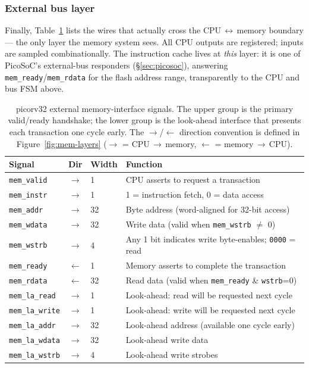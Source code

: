 \documentclass[9pt, a4paper]{extarticle}
\begin{document}
\subsubsection{External bus layer}

Finally, Table~\ref{tab:mem-signals} lists the wires that actually cross the CPU\,$\leftrightarrow$\,memory boundary --- the only layer the memory system sees. All CPU outputs are registered; inputs are sampled combinationally. The instruction cache lives at \emph{this} layer: it is one of PicoSoC's external-bus responders (\S\ref{sec:picosoc}), answering \texttt{mem\_ready}/\texttt{mem\_rdata} for the flash address range, transparently to the CPU and bus FSM above.

\begin{table}[htbp]
\centering\small
\begin{tabular}{@{}l c l p{6.3cm}@{}}
    \toprule
    Signal & Dir & Width & Function \\
    \midrule
    \texttt{mem\_valid} & $\to$ & 1 & CPU asserts to request a transaction \\
    \texttt{mem\_instr} & $\to$ & 1 & 1 = instruction fetch, 0 = data access \\
    \texttt{mem\_addr} & $\to$ & 32 & Byte address (word-aligned for 32-bit access) \\
    \texttt{mem\_wdata} & $\to$ & 32 & Write data (valid when \texttt{mem\_wstrb} $\neq$ 0) \\
    \texttt{mem\_wstrb} & $\to$ & 4 & Any 1 bit indicates write byte-enables; \texttt{0000} = read \\
    \texttt{mem\_ready} & $\leftarrow$ & 1 & Memory asserts to complete the transaction \\
    \texttt{mem\_rdata} & $\leftarrow$ & 32 & Read data (valid when \texttt{mem\_ready} \& \texttt{wstrb}=0) \\
    \midrule
    \texttt{mem\_la\_read} & $\to$ & 1 & Look-ahead: read will be requested next cycle \\
    \texttt{mem\_la\_write} & $\to$ & 1 & Look-ahead: write will be requested next cycle \\
    \texttt{mem\_la\_addr} & $\to$ & 32 & Look-ahead address (available one cycle early) \\
    \texttt{mem\_la\_wdata} & $\to$ & 32 & Look-ahead write data \\
    \texttt{mem\_la\_wstrb} & $\to$ & 4 & Look-ahead write strobes \\
    \bottomrule
\end{tabular}
\caption{picorv32 external memory-interface signals. The upper group is the primary valid/ready handshake; the lower group is the look-ahead interface that presents each transaction one cycle early. The \texttt{$\to$}/\texttt{$\leftarrow$} direction convention is defined in Figure~\ref{fig:mem-layers} (\texttt{$\to$} = CPU\,$\to$\,memory, \texttt{$\leftarrow$} = memory\,$\to$\,CPU).}
\label{tab:mem-signals}
\end{table}
\end{document}
